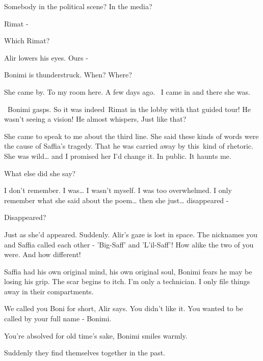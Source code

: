 \documentclass[letterpaper]{article}
\begin{document}
{\textquotedbl}Somebody in the political scene? In the media?{\textquotedbl} 

{\textquotedbl}Rimat -{\textquotedbl} 

{\textquotedbl}Which Rimat?{\textquotedbl} 

Alir lowers his eyes. {\textquotedbl}Ours -{\textquotedbl} 

Bonimi is thunderstruck. {\textquotedbl}When? Where?{\textquotedbl}

{\textquotedbl}She came by. To my room here. A few days ago. ~I came in and there she was.{\textquotedbl}

~Bonimi gasps. So it was indeed~Rimat in the lobby with that guided tour! He wasn't seeing a vision! He almost whispers,
{\textquotedbl}Just like that?{\textquotedbl} 

{\textquotedbl}She came to speak to me about the third line. She said these kinds of words were the cause of Saffia's
tragedy. That he was carried away by this~kind of{ }rhetoric. She was wild{\dots} and I promised her I'd
change it. In public. It haunts me.{\textquotedbl} 

{\textquotedbl}What else did she say?{\textquotedbl} 

{\textquotedbl}I don't remember. I was{\dots} I wasn't myself. I was too overwhelmed. I only remember what she said
about the poem{\dots} then she just{\dots} disappeared -{\textquotedbl} 

{\textquotedbl}Disappeared?{\textquotedbl} 

{\textquotedbl}Just as she'd appeared. Suddenly.{\textquotedbl} Alir's gaze is lost in space. {\textquotedbl}The
nicknames you and Saffia called each other - 'Big-Saff' and 'L'il-Saff'! How alike the two of you were. And how
different!{\textquotedbl} 

{\textquotedbl}Saffia had his own original mind, his own original soul,{\textquotedbl} Bonimi fears he may be losing his
grip. The scar begins to itch. {\textquotedbl}I'm only a technician. I only file things away in their
compartments.{\textquotedbl}

{\textquotedbl}We called you Boni for short,{\textquotedbl} Alir says. {\textquotedbl}You didn't like it. You wanted to
be called by your full name - Bonimi.{\textquotedbl}

{\textquotedbl}You're absolved for old time's sake,{\textquotedbl} Bonimi smiles warmly. 

Suddenly they find themselves together in the past. 
\end{document}

